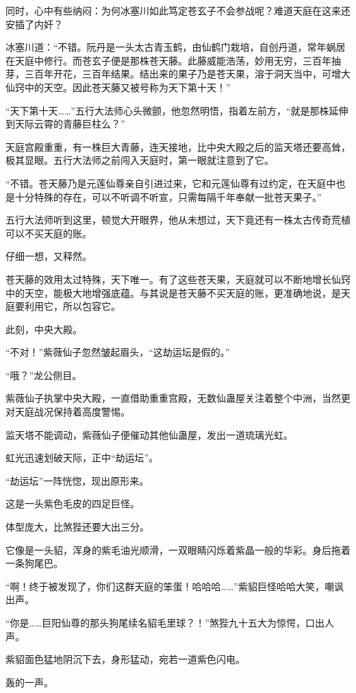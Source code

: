 \begin{this_body}
同时，心中有些纳闷：为何冰塞川如此笃定苍玄子不会参战呢？难道天庭在这来还安插了内奸？

冰塞川道：“不错。阮丹是一头太古青玉鹤，由仙鹤门栽培，自创丹道，常年蜗居在天庭中修行。而苍玄子便是那株苍天藤。此藤威能浩荡，妙用无穷，三百年抽芽，三百年开花，三百年结果。结出来的果子乃是苍天果，溶于洞天当中，可增大仙窍中的天空。因此苍天藤又被号称为天下第十天！”

“天下第十天……”五行大法师心头微颤，他忽然明悟，指着左前方，“就是那株延伸到天际云霄的青藤巨柱么？”

天庭宫殿重重，有一株巨大青藤，连天接地，比中央大殿之后的监天塔还要高耸，极其显眼。五行大法师之前闯入天庭时，第一眼就注意到了它。

“不错。苍天藤乃是元莲仙尊亲自引进过来，它和元莲仙尊有过约定，在天庭中也是十分特殊的存在，可以不听调不听宣，只需每隔千年奉献一批苍天果子。”

五行大法师听到这里，顿觉大开眼界，他从未想过，天下竟还有一株太古传奇荒植可以不买天庭的账。

仔细一想，又释然。

苍天藤的效用太过特殊，天下唯一。有了这些苍天果，天庭就可以不断地增长仙窍中的天空，能极大地增强底蕴。与其说是苍天藤不买天庭的账，更准确地说，是天庭要利用它，所以包容它。

此刻，中央大殿。

“不对！”紫薇仙子忽然皱起眉头，“这劫运坛是假的。”

“哦？”龙公侧目。

紫薇仙子执掌中央大殿，一直借助重重宫殿，无数仙蛊屋关注着整个中洲，当然更对天庭战况保持着高度警惕。

监天塔不能调动，紫薇仙子便催动其他仙蛊屋，发出一道琉璃光虹。

虹光迅速划破天际，正中“劫运坛”。

“劫运坛”一阵恍惚，现出原形来。

这是一头紫色毛皮的四足巨怪。

体型庞大，比煞狴还要大出三分。

它像是一头貂，浑身的紫毛油光顺滑，一双眼睛闪烁着紫晶一般的华彩。身后拖着一条狗尾巴。

“啊！终于被发现了，你们这群天庭的笨蛋！哈哈哈……”紫貂巨怪哈哈大笑，嘲讽出声。

“你是……巨阳仙尊的那头狗尾续名貂毛里球？！”煞狴九十五大为惊愕，口出人声。

紫貂面色猛地阴沉下去，身形猛动，宛若一道紫色闪电。

轰的一声。


\end{this_body}
